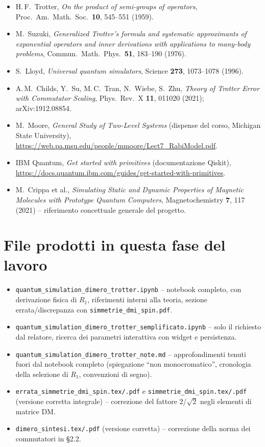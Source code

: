 \documentclass[11pt,a4paper]{article}
\begin{document}
\begin{itemize}
\item H.\,F.\ Trotter, \emph{On the product of semi-groups of operators},
Proc.\ Am.\ Math.\ Soc.\ \textbf{10}, 545--551 (1959).
\item M.\ Suzuki, \emph{Generalized Trotter's formula and systematic
approximants of exponential operators and inner derivations with
applications to many-body problems}, Commun.\ Math.\ Phys.\ \textbf{51},
183--190 (1976).
\item S.\ Lloyd, \emph{Universal quantum simulators}, Science \textbf{273},
1073--1078 (1996).
\item A.\,M.\ Childs, Y.\ Su, M.\,C.\ Tran, N.\ Wiebe, S.\ Zhu, \emph{Theory
of Trotter Error with Commutator Scaling}, Phys.\ Rev.\ X \textbf{11},
011020 (2021); arXiv:1912.08854.
\item M.\ Moore, \emph{General Study of Two-Level Systems} (dispense del
corso, Michigan State University),
\url{https://web.pa.msu.edu/people/mmoore/Lect7_RabiModel.pdf}.
\item IBM Quantum, \emph{Get started with primitives} (documentazione
Qiskit), \url{https://docs.quantum.ibm.com/guides/get-started-with-primitives}.
\item M.\ Crippa et al., \emph{Simulating Static and Dynamic Properties of
Magnetic Molecules with Prototype Quantum Computers}, Magnetochemistry
\textbf{7}, 117 (2021) -- riferimento concettuale generale del progetto.
\end{itemize}

\appendix
\section{File prodotti in questa fase del lavoro}

\begin{itemize}
\item \texttt{quantum\_simulation\_dimero\_trotter.ipynb} -- notebook
completo, con derivazione fisica di $R_1$, riferimenti interni alla
teoria, sezione errata/discrepanza con \texttt{simmetrie\_dmi\_spin.pdf}.
\item \texttt{quantum\_simulation\_dimero\_trotter\_semplificato.ipynb} --
solo il richiesto dal relatore, ricerca dei parametri interattiva con
widget e persistenza.
\item \texttt{quantum\_simulation\_dimero\_trotter\_note.md} -- approfondimenti
tenuti fuori dal notebook completo (spiegazione ``non monocromatico'',
cronologia della selezione di $R_1$, convenzioni di segno).
\item \texttt{errata\_simmetrie\_dmi\_spin.tex/.pdf} e
\texttt{simmetrie\_dmi\_spin.tex/.pdf} (versione corretta integrale) --
correzione del fattore $2$/$\sqrt2$ negli elementi di matrice DM.
\item \texttt{dimero\_sintesi.tex/.pdf} (versione corretta) -- correzione
della norma dei commutatori in \S2.2.
\end{itemize}
\end{document}
